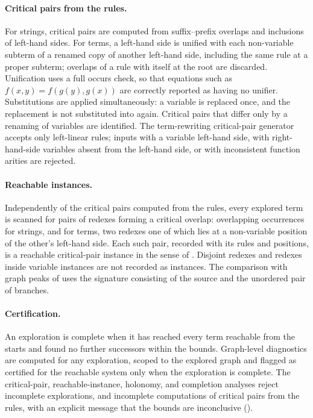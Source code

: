 \paragraph{Critical pairs from the rules.} For strings, critical pairs are computed from suffix--prefix overlaps and inclusions of left-hand sides. For terms, a left-hand side is unified with each non-variable subterm of a renamed copy of another left-hand side, including the same rule at a proper subterm; overlaps of a rule with itself at the root are discarded. Unification uses a full occurs check, so that equations such as $f(x,y) = f(g(y),g(x))$ are correctly reported as having no unifier. Substitutions are applied simultaneously: a variable is replaced once, and the replacement is not substituted into again. Critical pairs that differ only by a renaming of variables are identified. The term-rewriting critical-pair generator accepts only left-linear rules; inputs with a variable left-hand side, with right-hand-side variables absent from the left-hand side, or with inconsistent function arities are rejected.

\paragraph{Reachable instances.} Independently of the critical pairs computed from the rules, every explored term is scanned for pairs of redexes forming a critical overlap: overlapping occurrences for strings, and for terms, two redexes one of which lies at a non-variable position of the other's left-hand side. Each such pair, recorded with its rules and positions, is a reachable critical-pair instance in the sense of . Disjoint redexes and redexes inside variable instances are not recorded as instances. The comparison with graph peaks of  uses the signature consisting of the source and the unordered pair of branches.

\paragraph{Certification.} An exploration is complete when it has reached every term reachable from the starts and found no further successors within the bounds. Graph-level diagnostics are computed for any exploration, scoped to the explored graph and flagged as certified for the reachable system only when the exploration is complete. The critical-pair, reachable-instance, holonomy, and completion analyses reject incomplete explorations, and incomplete computations of critical pairs from the rules, with an explicit message that the bounds are inconclusive ().

